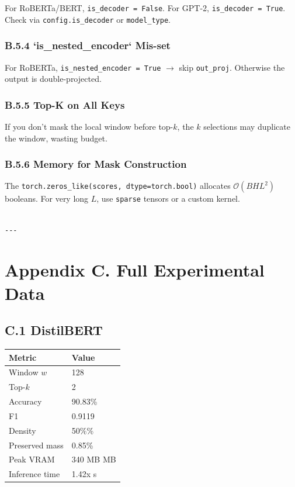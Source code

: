 For RoBERTa/BERT, \texttt{is\_decoder = False}. For GPT-2, \texttt{is\_decoder = True}. 
Check via \texttt{config.is\_decoder} or \texttt{model\_type}.

\subsubsection{B.5.4 `is\_nested\_encoder` Mis-set}

For RoBERTa, \texttt{is\_nested\_encoder = True} $\to$ skip \texttt{out\_proj}. Otherwise the 
output is double-projected.

\subsubsection{B.5.5 Top-K on All Keys}

If you don't mask the local window before top-$k$, the $k$ selections may 
duplicate the window, wasting budget.

\subsubsection{B.5.6 Memory for Mask Construction}

The \texttt{torch.zeros\_like(scores, dtype=torch.bool)} allocates 
$\mathcal{O}(B H L^2)$ booleans. For very long $L$, use \texttt{sparse} tensors 
or a custom kernel.
\begin{lstlisting}

---
\end{lstlisting}


\section{Appendix C. Full Experimental Data}

\subsection{C.1 DistilBERT}

\begin{table}[H]
\centering
\small
\begin{tabular}{ll}
\toprule
\textbf{Metric} & \textbf{Value} \\
\midrule
Window $w$ & 128 \\
Top-$k$ & 2 \\
Accuracy & 90.83\% \\
F1 & 0.9119 \\
Density & 50\%\% \\
Preserved mass & 0.85\% \\
Peak VRAM & 340 MB MB \\
Inference time & 1.42x s \\
\bottomrule
\end{tabular}
\end{table}

